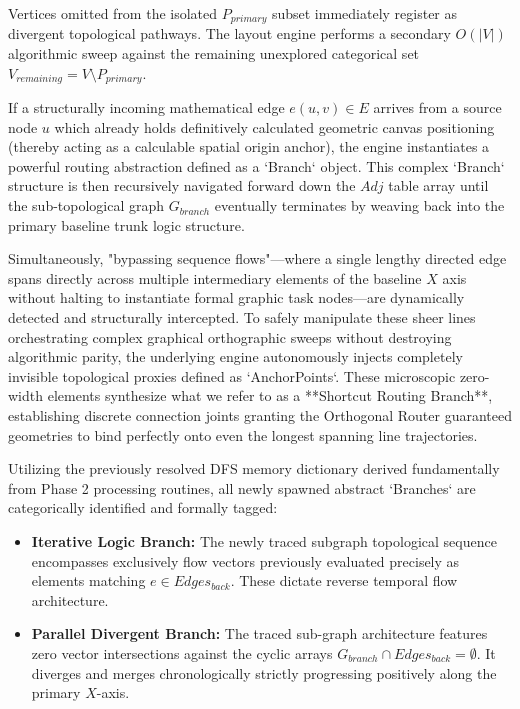 \documentclass[fleqn,10pt]{wlscirep}
\begin{document}
Vertices omitted from the isolated $P_{primary}$ subset immediately register as divergent topological pathways. The layout engine performs a secondary $O(|V|)$ algorithmic sweep against the remaining unexplored categorical set $V_{remaining} = V \setminus P_{primary}$. 

If a structurally incoming mathematical edge $e(u, v) \in E$ arrives from a source node $u$ which already holds definitively calculated geometric canvas positioning (thereby acting as a calculable spatial origin anchor), the engine instantiates a powerful routing abstraction defined as a `Branch` object. This complex `Branch` structure is then recursively navigated forward down the $Adj$ table array until the sub-topological graph $G_{branch}$ eventually terminates by weaving back into the primary baseline trunk logic structure.

Simultaneously, "bypassing sequence flows"—where a single lengthy directed edge spans directly across multiple intermediary elements of the baseline $X$ axis without halting to instantiate formal graphic task nodes—are dynamically detected and structurally intercepted. To safely manipulate these sheer lines orchestrating complex graphical orthographic sweeps without destroying algorithmic parity, the underlying engine autonomously injects completely invisible topological proxies defined as `AnchorPoints`. These microscopic zero-width elements synthesize what we refer to as a **Shortcut Routing Branch**, establishing discrete connection joints granting the Orthogonal Router guaranteed geometries to bind perfectly onto even the longest spanning line trajectories.

Utilizing the previously resolved DFS memory dictionary derived fundamentally from Phase 2 processing routines, all newly spawned abstract `Branches` are categorically identified and formally tagged:
\begin{itemize}
    \item \textbf{Iterative Logic Branch:} The newly traced subgraph topological sequence encompasses exclusively flow vectors previously evaluated precisely as elements matching $e \in Edges_{back}$. These dictate reverse temporal flow architecture.
    \item \textbf{Parallel Divergent Branch:} The traced sub-graph architecture features zero vector intersections against the cyclic arrays $G_{branch} \cap Edges_{back} = \emptyset$. It diverges and merges chronologically strictly progressing positively along the primary $X$-axis.
\end{itemize}
\end{document}
